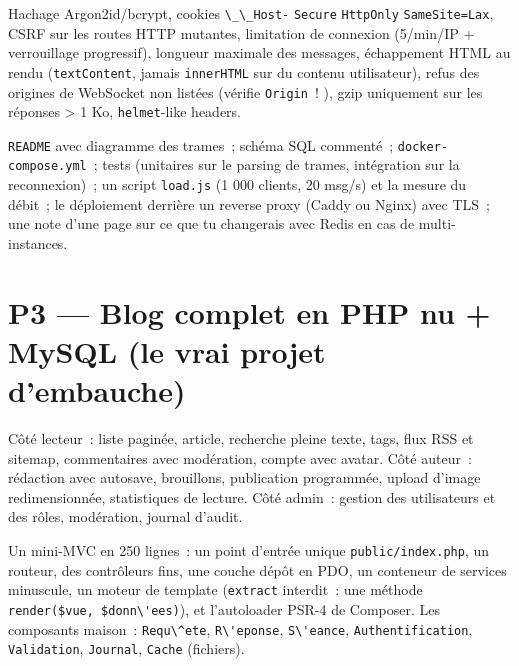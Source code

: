 Hachage Argon2id/bcrypt, cookies \verb|\_\_Host-| \verb|Secure| \verb|HttpOnly| \verb|SameSite=Lax|,
CSRF sur les routes HTTP mutantes, limitation de connexion (5/min/IP + verrouillage progressif),
longueur maximale des messages, \'echappement HTML au rendu (\verb|textContent|, jamais
\verb|innerHTML| sur du contenu utilisateur), refus des origines de WebSocket non list\'ees
(v\'erifie \verb|Origin|~! ), gzip uniquement sur les r\'eponses > 1 Ko, \verb|helmet|-like headers.

\verb|README| avec diagramme des trames~; sch\'ema SQL comment\'e~; \verb|docker-compose.yml|~;
tests (unitaires sur le parsing de trames, int\'egration sur la reconnexion)~; un script
\verb|load.js| (1 000 clients, 20 msg/s) et la mesure du d\'ebit~; le d\'eploiement derri\`ere un reverse
proxy (Caddy ou Nginx) avec TLS~; une note d'une page sur ce que tu changerais avec Redis
en cas de multi-instances.

\section{P3 --- Blog complet en PHP nu + MySQL (le vrai projet d'embauche)}

C\^ot\'e lecteur~: liste pagin\'ee, article, recherche pleine texte, tags, flux RSS et sitemap,
commentaires avec mod\'eration, compte avec avatar. C\^ot\'e auteur~: r\'edaction avec autosave,
brouillons, publication programm\'ee, upload d'image redimensionn\'ee, statistiques de lecture.
C\^ot\'e admin~: gestion des utilisateurs et des r\^oles, mod\'eration, journal d'audit.

Un mini-MVC en 250 lignes~: un point d'entr\'ee unique \verb|public/index.php|, un routeur,
des contr\^oleurs fins, une couche d\'ep\^ot en PDO, un conteneur de services minuscule, un moteur de
template (\verb|extract| interdit~: une m\'ethode \verb|render($vue, $donn\'ees)|), et
l'autoloader PSR-4 de Composer. Les composants maison~: \verb|Requ\^ete|, \verb|R\'eponse|,
\verb|S\'eance|, \verb|Authentification|, \verb|Validation|, \verb|Journal|, \verb|Cache| (fichiers).

